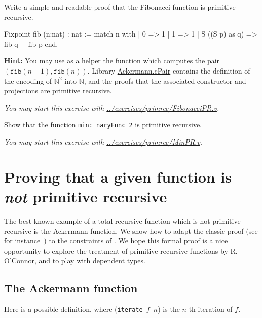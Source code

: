 
\begin{exercise}
Write a simple and readable proof that the Fibonacci function is primitive recursive.


\begin{Coqsrc}
Fixpoint fib (n:nat) : nat :=
  match n with
  | 0 => 1
  | 1 => 1
  | S ((S p) as q) => fib q + fib p
  end.
\end{Coqsrc}

\textbf{Hint:}  You may use as a helper the function which computes the pair 
$(\texttt{fib}(n+1),\texttt{fib}(n))$. 
Library \href{../theories/html/hydras.Ackermann.cPair.html}{Ackermann.cPair} contains
the definition of the encoding of $\mathbb{N}^2$ into $\mathbb{N}$, and the proofs that 
the associated constructor and projections are primitive recursive.

\emph{You may start this exercise with
\url{../exercises/primrec/FibonacciPR.v}.}

\end{exercise}

\begin{exercise}
Show that the function \texttt{min: naryFunc\,2} is primitive
recursive.

\emph{You may start this exercise with
\url{../exercises/primrec/MinPR.v}.}

\end{exercise}


\section{Proving that a given function is \emph{not} primitive recursive}

The best known example of a total recursive function which is not primitive recursive is the Ackermann function. We show how to adapt the classic proof (see for instance~\cite{planetmath}) to the constraints of \gallina. We hope this formal proof 
 is a nice opportunity to explore
the treatment of primitive recursive functions by R. O'Connor,
and to play with dependent types.

\subsection{The Ackermann function}

Here is a possible definition, where (\texttt{iterate\,$f$\,$n$})
is the $n$-th iteration of $f$.

